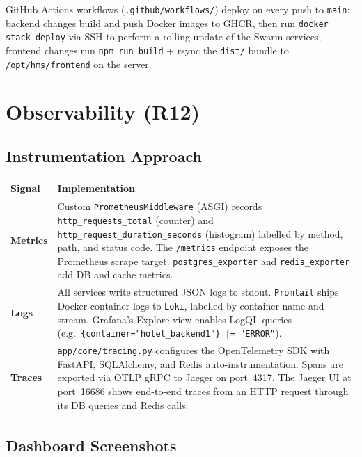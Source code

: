 \documentclass[12pt,a4paper]{article}
\begin{document}
GitHub Actions workflows (\texttt{.github/workflows/}) deploy on every push to \texttt{main}: backend changes build and push Docker images to GHCR, then run \texttt{docker stack deploy} via SSH to perform a rolling update of the Swarm services; frontend changes run \texttt{npm run build} + rsync the \texttt{dist/} bundle to \texttt{/opt/hms/frontend} on the server.

\section{Observability (R12)}

\subsection{Instrumentation Approach}

\begin{table}[H]
\centering\small
\begin{tabularx}{\linewidth}{@{} l X @{}}
\toprule
\textbf{Signal} & \textbf{Implementation} \\
\midrule
\textbf{Metrics} & Custom \texttt{PrometheusMiddleware} (ASGI) records \texttt{http\_requests\_total} (counter) and \texttt{http\_request\_duration\_seconds} (histogram) labelled by method, path, and status code. The \texttt{/metrics} endpoint exposes the Prometheus scrape target. \texttt{postgres\_exporter} and \texttt{redis\_exporter} add DB and cache metrics. \\[4pt]
\textbf{Logs}    & All services write structured JSON logs to stdout. \texttt{Promtail} ships Docker container logs to \texttt{Loki}, labelled by container name and stream. Grafana's Explore view enables LogQL queries (e.g.\ \texttt{\{container="hotel\_backend1"\} |= "ERROR"}). \\[4pt]
\textbf{Traces}  & \texttt{app/core/tracing.py} configures the OpenTelemetry SDK with FastAPI, SQLAlchemy, and Redis auto-instrumentation. Spans are exported via OTLP gRPC to Jaeger on port~4317. The Jaeger UI at port~16686 shows end-to-end traces from an HTTP request through its DB queries and Redis calls. \\
\bottomrule
\end{tabularx}
\end{table}

\subsection{Dashboard Screenshots}
\end{document}
